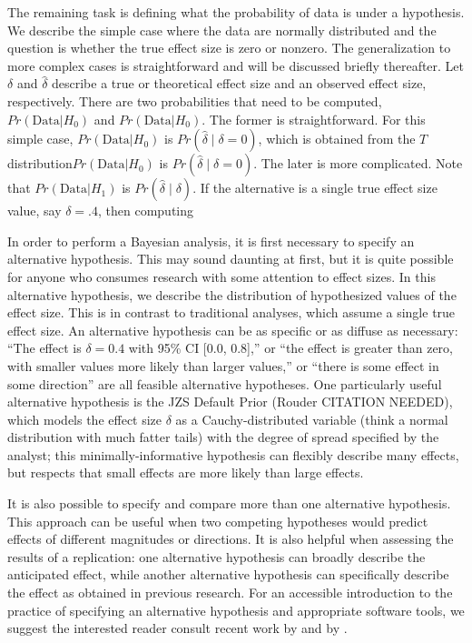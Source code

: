 \documentclass[fignum,nobf,man]{apa}
\begin{document}
The remaining task is defining what the probability of data is under a hypothesis.  We describe the simple case where the data are normally distributed and the question is whether the true effect size is zero or nonzero.  The generalization to more complex cases is straightforward and will be discussed briefly thereafter.  Let $\delta$ and $\hat{\delta}$ describe a true or theoretical effect size and an observed effect size, respectively.  There are two probabilities that need to be computed,   $Pr(\mbox{Data} | H_0)$ and $Pr(\mbox{Data} | H_0)$.   The former is straightforward.  For this simple case, $Pr(\mbox{Data} | H_0)$ is $Pr(\hat{\delta} \mid \delta=0)$, which is obtained from the $T$ distribution$Pr(\mbox{Data} | H_0)$ is $Pr(\hat{\delta} \mid \delta=0)$.  The later is more complicated.  Note that $Pr(\mbox{Data} | H_1)$ is $Pr(\hat{\delta} \mid \delta)$.  If the alternative is a single true effect size value, say $\delta=.4$, then computing 



In order to perform a Bayesian analysis, it is first necessary to specify an alternative hypothesis. This may sound daunting at first, but it is quite possible for anyone who consumes research with some attention to effect sizes. In this alternative hypothesis, we describe the distribution of hypothesized values of the effect size. This is in contrast to traditional analyses, which assume a single true effect size. An alternative hypothesis can be as specific or as diffuse as necessary: ``The effect is $\delta = 0.4$ with 95\% CI [0.0, 0.8],'' or ``the effect is greater than zero, with smaller values more likely than larger values,'' or ``there is some effect in some direction'' are all feasible alternative hypotheses. One particularly useful alternative hypothesis is the JZS Default Prior (Rouder CITATION NEEDED), which models the effect size $\delta$ as a Cauchy-distributed variable (think a normal distribution with much fatter tails) with the degree of spread specified by the analyst; this minimally-informative hypothesis can flexibly describe many effects, but respects that small effects are more likely than large effects.

It is also possible to specify and compare more than one alternative hypothesis. This approach can be useful when two competing hypotheses would predict effects of different magnitudes or directions. It is also helpful when assessing the results of a replication: one alternative hypothesis can broadly describe the anticipated effect, while another alternative hypothesis can specifically describe the effect as obtained in previous research. \citep[see][for an example]{Boekel:etal:in press} %
For an accessible introduction to the practice of specifying an alternative hypothesis and appropriate software tools, we suggest the interested reader consult recent work by \citet{Dienes:2011,Dienes:2014} and by \citet{Rouder:etal:2012a, Rouder:etal:2012b}. %
\end{document}
